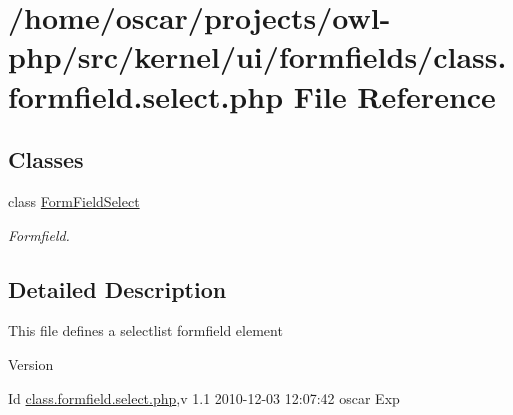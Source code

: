 \section{/home/oscar/projects/owl-\/php/src/kernel/ui/formfields/class.formfield.select.php File Reference}
\label{class_8formfield_8select_8php}
\subsection*{Classes}
\begin{DoxyCompactItemize}
\item 
class \hyperlink{classFormFieldSelect}{FormFieldSelect}
\begin{DoxyCompactList}\small\item\em Formfield. \item\end{DoxyCompactList}\end{DoxyCompactItemize}


\subsection{Detailed Description}
This file defines a selectlist formfield element \begin{DoxyVersion}{Version}

\end{DoxyVersion}
\begin{DoxyParagraph}{Id}
\hyperlink{class_8formfield_8select_8php}{class.formfield.select.php},v 1.1 2010-\/12-\/03 12:07:42 oscar Exp 
\end{DoxyParagraph}
